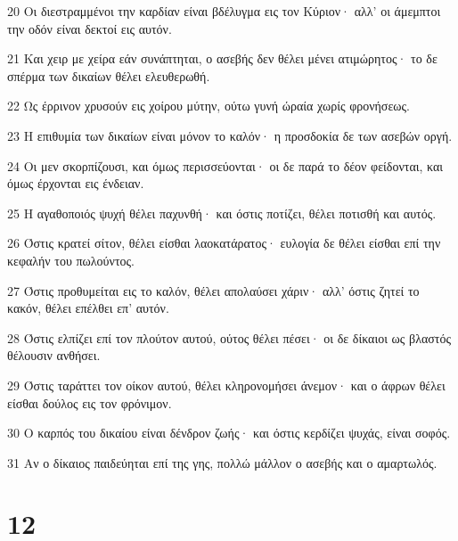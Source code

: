 \par 20 Οι διεστραμμένοι την καρδίαν είναι βδέλυγμα εις τον Κύριον· αλλ' οι άμεμπτοι την οδόν είναι δεκτοί εις αυτόν.
\par 21 Και χειρ με χείρα εάν συνάπτηται, ο ασεβής δεν θέλει μένει ατιμώρητος· το δε σπέρμα των δικαίων θέλει ελευθερωθή.
\par 22 Ως έρρινον χρυσούν εις χοίρου μύτην, ούτω γυνή ώραία χωρίς φρονήσεως.
\par 23 Η επιθυμία των δικαίων είναι μόνον το καλόν· η προσδοκία δε των ασεβών οργή.
\par 24 Οι μεν σκορπίζουσι, και όμως περισσεύονται· οι δε παρά το δέον φείδονται, και όμως έρχονται εις ένδειαν.
\par 25 Η αγαθοποιός ψυχή θέλει παχυνθή· και όστις ποτίζει, θέλει ποτισθή και αυτός.
\par 26 Όστις κρατεί σίτον, θέλει είσθαι λαοκατάρατος· ευλογία δε θέλει είσθαι επί την κεφαλήν του πωλούντος.
\par 27 Όστις προθυμείται εις το καλόν, θέλει απολαύσει χάριν· αλλ' όστις ζητεί το κακόν, θέλει επέλθει επ' αυτόν.
\par 28 Όστις ελπίζει επί τον πλούτον αυτού, ούτος θέλει πέσει· οι δε δίκαιοι ως βλαστός θέλουσιν ανθήσει.
\par 29 Όστις ταράττει τον οίκον αυτού, θέλει κληρονομήσει άνεμον· και ο άφρων θέλει είσθαι δούλος εις τον φρόνιμον.
\par 30 Ο καρπός του δικαίου είναι δένδρον ζωής· και όστις κερδίζει ψυχάς, είναι σοφός.
\par 31 Αν ο δίκαιος παιδεύηται επί της γης, πολλώ μάλλον ο ασεβής και ο αμαρτωλός.

\chapter{12}

